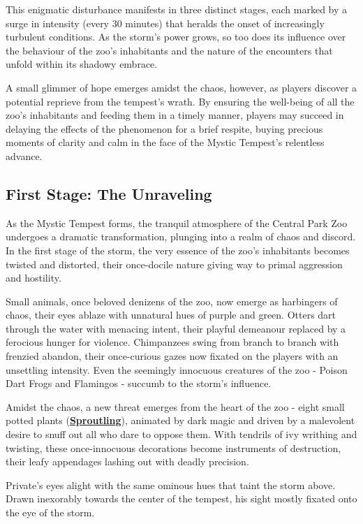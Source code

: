 This enigmatic disturbance manifests in three distinct stages, each marked by a surge in intensity (every 30 minutes) that heralds the onset of increasingly turbulent conditions. As the storm's power grows, so too does its influence over the behaviour of the zoo's inhabitants and the nature of the encounters that unfold within its shadowy embrace.

A small glimmer of hope emerges amidst the chaos, however, as players discover a potential reprieve from the tempest's wrath. By ensuring the well-being of all the zoo's inhabitants and feeding them in a timely manner, players may succeed in delaying the effects of the phenomenon for a brief respite, buying precious moments of clarity and calm in the face of the Mystic Tempest's relentless advance.
\subsection*{First Stage: The Unraveling}
As the Mystic Tempest forms, the tranquil atmosphere of the Central Park Zoo undergoes a dramatic transformation, plunging into a realm of chaos and discord. In the first stage of the storm, the very essence of the zoo's inhabitants becomes twisted and distorted, their once-docile nature giving way to primal aggression and hostility.

Small animals, once beloved denizens of the zoo, now emerge as harbingers of chaos, their eyes ablaze with unnatural hues of purple and green. Otters dart through the water with menacing intent, their playful demeanour replaced by a ferocious hunger for violence. Chimpanzees swing from branch to branch with frenzied abandon, their once-curious gazes now fixated on the players with an unsettling intensity. Even the seemingly innocuous creatures of the zoo - Poison Dart Frogs and Flamingos - succumb to the storm's influence.

Amidst the chaos, a new threat emerges from the heart of the zoo - eight small potted plants (\hyperref[sec:Sproutling]{\textbf{Sproutling}}), animated by dark magic and driven by a malevolent desire to snuff out all who dare to oppose them. With tendrils of ivy writhing and twisting, these once-innocuous decorations become instruments of destruction, their leafy appendages lashing out with deadly precision.

Private's eyes alight with the same ominous hues that taint the storm above. Drawn inexorably towards the center of the tempest, his sight mostly fixated onto the eye of the storm.


